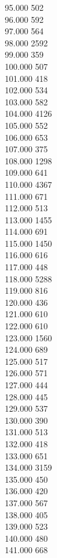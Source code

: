 { 95.000	502 \\
 96.000	592 \\
 97.000	564 \\
 98.000	2592 \\
 99.000	359 \\
 100.000	507 \\
 101.000	418 \\
 102.000	534 \\
 103.000	582 \\
 104.000	4126 \\
 105.000	552 \\
 106.000	653 \\
 107.000	375 \\
 108.000	1298 \\
 109.000	641 \\
 110.000	4367 \\
 111.000	671 \\
 112.000	513 \\
 113.000	1455 \\
 114.000	691 \\
 115.000	1450 \\
 116.000	616 \\
 117.000	448 \\
 118.000	5288 \\
 119.000	816 \\
 120.000	436 \\
 121.000	610 \\
 122.000	610 \\
 123.000	1560 \\
 124.000	689 \\
 125.000	517 \\
 126.000	571 \\
 127.000	444 \\
 128.000	445 \\
 129.000	537 \\
 130.000	390 \\
 131.000	513 \\
 132.000	418 \\
 133.000	651 \\
 134.000	3159 \\
 135.000	450 \\
 136.000	420 \\
 137.000	567 \\
 138.000	405 \\
 139.000	523 \\
 140.000	480 \\
 141.000	668 \\
}
